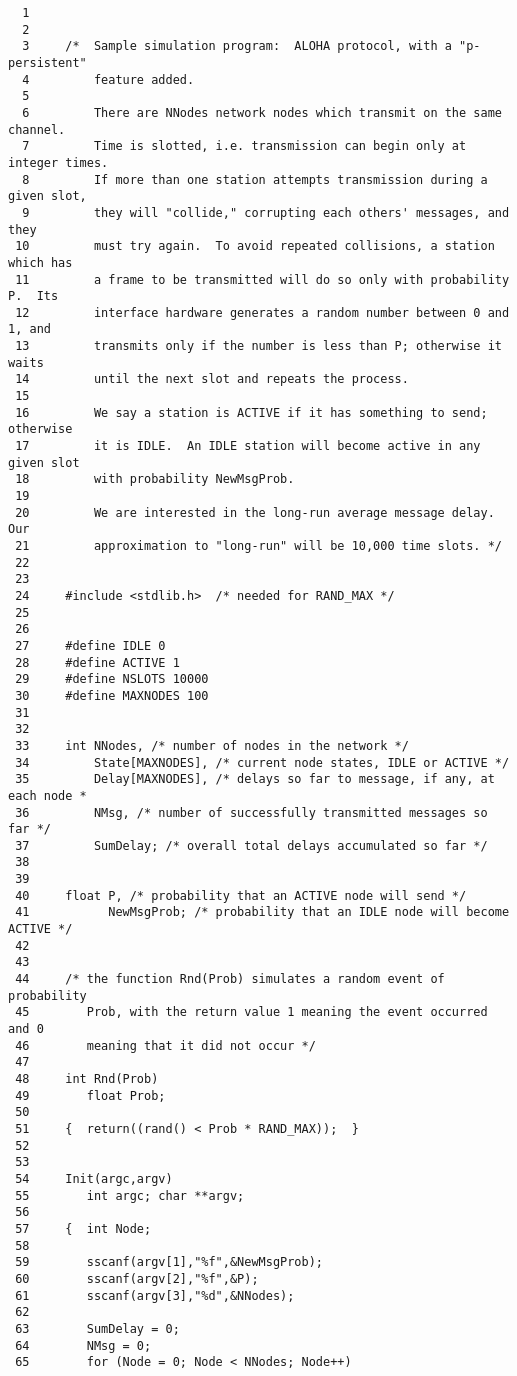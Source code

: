 \documentclass[11pt]{article}
\begin{document}
\begin{verbatim}
  1     
  2     
  3     /*  Sample simulation program:  ALOHA protocol, with a "p-persistent"
  4         feature added.
  5     
  6         There are NNodes network nodes which transmit on the same channel.
  7         Time is slotted, i.e. transmission can begin only at integer times.
  8         If more than one station attempts transmission during a given slot,
  9         they will "collide," corrupting each others' messages, and they
 10         must try again.  To avoid repeated collisions, a station which has
 11         a frame to be transmitted will do so only with probability P.  Its
 12         interface hardware generates a random number between 0 and 1, and
 13         transmits only if the number is less than P; otherwise it waits 
 14         until the next slot and repeats the process.
 15     
 16         We say a station is ACTIVE if it has something to send; otherwise
 17         it is IDLE.  An IDLE station will become active in any given slot
 18         with probability NewMsgProb. 
 19     
 20         We are interested in the long-run average message delay.   Our
 21         approximation to "long-run" will be 10,000 time slots. */
 22     
 23     
 24     #include <stdlib.h>  /* needed for RAND_MAX */
 25     
 26     
 27     #define IDLE 0
 28     #define ACTIVE 1
 29     #define NSLOTS 10000
 30     #define MAXNODES 100
 31     
 32     
 33     int NNodes, /* number of nodes in the network */
 34         State[MAXNODES], /* current node states, IDLE or ACTIVE */
 35         Delay[MAXNODES], /* delays so far to message, if any, at each node *
 36         NMsg, /* number of successfully transmitted messages so far */
 37         SumDelay; /* overall total delays accumulated so far */
 38     
 39     
 40     float P, /* probability that an ACTIVE node will send */
 41           NewMsgProb; /* probability that an IDLE node will become ACTIVE */
 42     
 43     
 44     /* the function Rnd(Prob) simulates a random event of probability
 45        Prob, with the return value 1 meaning the event occurred and 0
 46        meaning that it did not occur */
 47     
 48     int Rnd(Prob)
 49        float Prob;
 50     
 51     {  return((rand() < Prob * RAND_MAX));  }
 52     
 53     
 54     Init(argc,argv)
 55        int argc; char **argv;
 56     
 57     {  int Node;
 58        
 59        sscanf(argv[1],"%f",&NewMsgProb);
 60        sscanf(argv[2],"%f",&P);
 61        sscanf(argv[3],"%d",&NNodes);
 62     
 63        SumDelay = 0;
 64        NMsg = 0;
 65        for (Node = 0; Node < NNodes; Node++)  

\end{verbatim}
\end{document}
